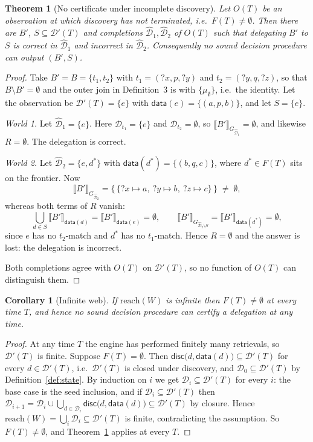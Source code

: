 \documentclass[11pt,a4paper]{article}
\theoremstyle{definition}
\theoremstyle{plain}
\newtheorem{theorem}{Theorem}
\newtheorem{corollary}{Corollary}
\theoremstyle{remark}
\newcommand{\Dd}{\mathcal{D}}
\newcommand{\dataf}{\mathsf{data}}
\newcommand{\disc}{\mathsf{disc}}
\newcommand{\reach}{\mathrm{reach}}
\newcommand{\ev}[2]{\llbracket #1 \rrbracket_{#2}}
\begin{document}
\begin{theorem}[No certificate under incomplete discovery]
\label{thm:nocert}
Let $O(T)$ be an observation at which discovery has not terminated, i.e.\ $F(T) \neq \emptyset$. Then there
are $B'$, $S \subseteq \Dd'(T)$ and completions $\widehat{\Dd}_1, \widehat{\Dd}_2$ of
$O(T)$ such that delegating $B'$ to $S$ is correct in $\widehat{\Dd}_1$ and incorrect in
$\widehat{\Dd}_2$. Consequently no sound decision procedure can output $(B', S)$.
\end{theorem}

\begin{proof}
Take $B' = B = \{t_1, t_2\}$ with
$t_1 = (?x, p, ?y)$ and $t_2 = (?y, q, ?z)$, so that $B \setminus B' = \emptyset$ and the
outer join in Definition~3 is with $\{\mu_\emptyset\}$, i.e.\ the identity. Let the
observation be $\Dd'(T) = \{e\}$ with $\dataf(e) = \{(a,p,b)\}$, and let $S = \{e\}$.

\emph{World 1.} Let $\widehat{\Dd}_1 = \{e\}$. Here $\Dd_{t_1} = \{e\}$ and
$\Dd_{t_2} = \emptyset$, so $\ev{B'}{G_{\widehat{\Dd}_1}} = \emptyset$, and likewise
$R = \emptyset$. The delegation is correct.

\emph{World 2.} Let $\widehat{\Dd}_2 = \{e, d^{*}\}$ with
$\dataf(d^{*}) = \{(b,q,c)\}$, where $d^{*} \in F(T)$ sits on the frontier. Now
\[
  \ev{B'}{G_{\widehat{\Dd}_2}} = \bigl\{\, \{?x \mapsto a,\ ?y \mapsto b,\ ?z \mapsto c\} \,\bigr\}
  \;\neq\; \emptyset,
\]
whereas both terms of $R$ vanish:
\[
  \bigcup_{d \in S} \ev{B'}{\dataf(d)} = \ev{B'}{\dataf(e)} = \emptyset,
  \qquad
  \ev{B'}{G_{\widehat{\Dd}_2 \setminus S}} = \ev{B'}{\dataf(d^{*})} = \emptyset,
\]
since $e$ has no $t_2$-match and $d^{*}$ has no $t_1$-match. Hence $R = \emptyset$ and
the answer is lost: the delegation is incorrect.

Both completions agree with $O(T)$ on $\Dd'(T)$, so no function of $O(T)$ can
distinguish them.
\end{proof}

\begin{corollary}[Infinite web]
\label{cor:infinite}
If $\reach(W)$ is infinite then $F(T) \neq \emptyset$ at every time $T$, and hence no
sound decision procedure can certify a delegation at any time.
\end{corollary}

\begin{proof}
At any time $T$ the engine has performed finitely many retrievals, so $\Dd'(T)$ is
finite. Suppose $F(T) = \emptyset$. Then $\disc\bigl(d, \dataf(d)\bigr) \subseteq \Dd'(T)$
for every $d \in \Dd'(T)$, i.e.\ $\Dd'(T)$ is closed under discovery, and
$\Dd_0 \subseteq \Dd'(T)$ by Definition~\ref{def:state}. By induction on $i$ we get
$\Dd_i \subseteq \Dd'(T)$ for every $i$: the base case is the seed inclusion, and if
$\Dd_i \subseteq \Dd'(T)$ then
$\Dd_{i+1} = \Dd_i \cup \bigcup_{d \in \Dd_i} \disc\bigl(d, \dataf(d)\bigr) \subseteq
\Dd'(T)$ by closure. Hence $\reach(W) = \bigcup_i \Dd_i \subseteq \Dd'(T)$ is finite,
contradicting the assumption. So $F(T) \neq \emptyset$, and Theorem~\ref{thm:nocert}
applies at every $T$.
\end{proof}
\end{document}
